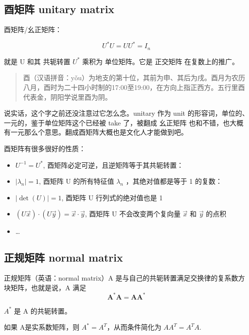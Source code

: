 \documentclass[
]{book}
\providecommand{\tightlist}{%
  \setlength{\itemsep}{0pt}\setlength{\parskip}{0pt}}
\begin{document}
\hypertarget{ux9149ux77e9ux9635-unitary-matrix}{%
\subsection{酉矩阵 unitary matrix}\label{ux9149ux77e9ux9635-unitary-matrix}}

酉矩阵/幺正矩阵：

\[{\displaystyle U^{*}U=UU^{*}=I_{n}}\]

就是 U 和其 共轭转置 \(U^*\) 乘积为 单位矩阵。它是 正交矩阵 在复数上的推广。

\begin{quote}
酉（汉语拼音：yǒu）为地支的第十位，其前为申、其后为戌。酉月为农历八月，酉时为二十四小时制的17:00至19:00，在方向上指正西方。五行里酉代表金，阴阳学说里酉为阴。
\end{quote}

说实话，这个字之前还没注意过它怎么念。unitary 作为 unit 的形容词，单位的、一元的，鉴于单位矩阵这个已经被 take 了，被翻成 幺正矩阵 也和不错，也大概有一元那么个意思。翻成酉矩阵大概也是文化人才能做到吧。

酉矩阵有很多很好的性质：

\begin{itemize}
\tightlist
\item
  \({\displaystyle U^{-1}=U^{*}}\), 酉矩阵必定可逆，且逆矩阵等于其共轭转置：
\item
  \(|\lambda_n| = 1\), 酉矩阵 U 的所有特征值 \(λ_n\) ，其绝对值都是等于 1 的复数：
\item
  \({\displaystyle \left|\det(U)\right|=1}\), 酉矩阵 U 行列式的绝对值也是 1
\item
  \({\displaystyle (U\vec {x} )\cdot (U\vec {y} )=\vec {x} \cdot \vec {y} }\), 酉矩阵 U 不会改变两个复向量
  \(\vec{x}\) 和 \(\vec{y}\) 的点积
\item
  \ldots{}
\end{itemize}

\hypertarget{ux6b63ux89c4ux77e9ux9635-normal-matrix}{%
\subsection{正规矩阵 normal matrix}\label{ux6b63ux89c4ux77e9ux9635-normal-matrix}}

正规矩阵（英语：normal matrix）A 是与自己的共轭转置满足交换律的复系数方块矩阵，也就是说，A 满足
\[\mathbf{A}^* \mathbf{A} =  \mathbf{A} \mathbf{A}^*\]

\(A^*\) 是 A 的共轭转置。

如果 A是实系数矩阵，则 \(A^* = A^T\)，从而条件简化为 \(AA^T = A^TA\).
\end{document}
